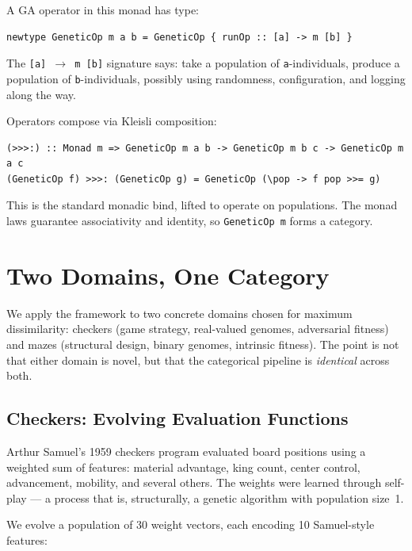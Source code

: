 \documentclass[10pt]{article}
\begin{document}
A GA operator in this monad has type:

\begin{lstlisting}[style=haskellstyle]
newtype GeneticOp m a b = GeneticOp { runOp :: [a] -> m [b] }
\end{lstlisting}

The \texttt{[a] $\to$ m [b]} signature says: take a population of \texttt{a}-individuals, produce a population of \texttt{b}-individuals, possibly using randomness, configuration, and logging along the way.

Operators compose via Kleisli composition:

\begin{lstlisting}[style=haskellstyle]
(>>>:) :: Monad m => GeneticOp m a b -> GeneticOp m b c -> GeneticOp m a c
(GeneticOp f) >>>: (GeneticOp g) = GeneticOp (\pop -> f pop >>= g)
\end{lstlisting}

This is the standard monadic bind, lifted to operate on populations. The monad laws guarantee associativity and identity, so \texttt{GeneticOp m} forms a category.

\section{Two Domains, One Category}

We apply the framework to two concrete domains chosen for maximum dissimilarity: checkers (game strategy, real-valued genomes, adversarial fitness) and mazes (structural design, binary genomes, intrinsic fitness). The point is not that either domain is novel, but that the categorical pipeline is \emph{identical} across both.

\subsection{Checkers: Evolving Evaluation Functions}

Arthur Samuel's 1959 checkers program evaluated board positions using a weighted sum of features: material advantage, king count, center control, advancement, mobility, and several others. The weights were learned through self-play --- a process that is, structurally, a genetic algorithm with population size~1.

We evolve a population of 30 weight vectors, each encoding 10 Samuel-style features:
\end{document}
